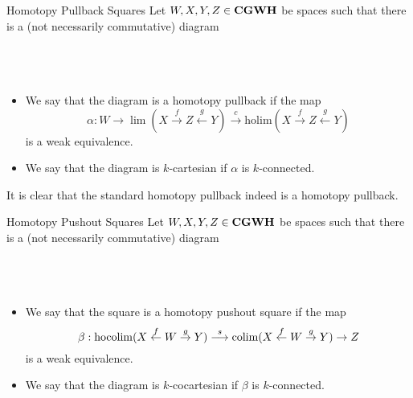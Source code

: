 \documentclass[a4paper]{article}
\begin{document}
\begin{defn}{Homotopy Pullback Squares}{} Let $W,X,Y,Z\in\bold{CGWH}$ be spaces such that there is a (not necessarily commutative) diagram \\~\\
\\~\\
\begin{itemize}
\item We say that the diagram is a homotopy pullback if the map $$\alpha:W\to\lim(X\overset{f}{\rightarrow}Z\overset{g}{\leftarrow}Y)\overset{c}{\longrightarrow}\text{holim}(X\overset{f}{\rightarrow}Z\overset{g}{\leftarrow}Y)$$ is a weak equivalence. 
\item We say that the diagram is $k$-cartesian if $\alpha$ is $k$-connected. 
\end{itemize}
\end{defn}

It is clear that the standard homotopy pullback indeed is a homotopy pullback. 

\begin{defn}{Homotopy Pushout Squares}{} Let $W,X,Y,Z\in\bold{CGWH}$ be spaces such that there is a (not necessarily commutative) diagram \\~\\
\\~\\
\begin{itemize}
\item We say that the square is a homotopy pushout square if the map $$\beta:\operatorname*{hocolim}(X\overset{f}{\leftarrow}W\overset{g}{\rightarrow}Y)\overset{s}{\longrightarrow}\operatorname*{colim}(X\overset{f}{\leftarrow}W\overset{g}{\rightarrow}Y)\to Z$$ is a weak equivalence. 
\item We say that the diagram is $k$-cocartesian if $\beta$ is $k$-connected. 
\end{itemize}
\end{defn}
\end{document}
